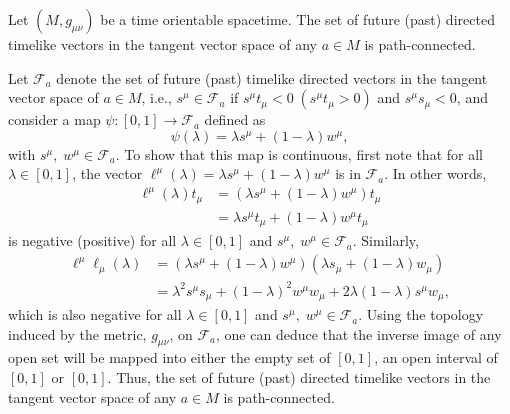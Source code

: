 \documentclass[
12pt,		%
openright,	%
twoside,  %
a4paper,			%
chapter=TITLE,		%
english,			%
french,				%
spanish,			%
brazil				%
]{USPSC-classe/USPSC}
\newenvironment{sproof}{%
  \renewcommand{\proofname}{Sketch of Proof}\proof}{\endproof}
\begin{document}
\begin{proposition}\label{lightcone}
    Let $(M,g_{\mu\nu})$ be a time orientable spacetime. The set of future (past) directed timelike vectors in the tangent vector space of any $a\in M$ is path-connected.
\end{proposition}
\begin{sproof}
    Let $\mathcal{F}_a$ denote the set of future (past) timelike directed vectors in the tangent vector space of $a\in M$, i.e., $s^{\mu}\in\mathcal{F}_a$ if $s^{\mu}t_{\mu}<0\;(s^{\mu}t_{\mu}>0)$ and $s^{\mu}s_{\mu}<0$, and consider a map $\psi:[0,1]\to\mathcal{F}_a$ defined as
    \begin{equation}
        \psi(\lambda)=\lambda s^{\mu}+(1-\lambda)w^{\mu},
    \end{equation}
    with $s^{\mu},\;w^{\mu}\in\mathcal{F}_a$. To show that this map is continuous, first note that for all $\lambda\in[0,1]$, the vector $\ell^{\mu}(\lambda)=\lambda s^{\mu}+(1-\lambda)w^{\mu}$ is in $\mathcal{F}_a$. In other words,
    \begin{equation}
        \begin{aligned}
           \ell^{\mu}(\lambda)t_{\mu}&=(\lambda s^{\mu}+(1-\lambda)w^{\mu})t_{\mu}\\
           &=\lambda s^{\mu}t_{\mu}+(1-\lambda)w^{\mu}t_{\mu}
        \end{aligned}
    \end{equation}
is negative (positive) for all $\lambda\in[0,1]$ and $s^{\mu},\;w^{\mu}\in\mathcal{F}_a$. Similarly,
\begin{equation}
        \begin{aligned}
           \ell^{\mu}\ell_{\mu}(\lambda)&=(\lambda s^{\mu}+(1-\lambda)w^{\mu})(\lambda s_{\mu}+(1-\lambda)w_{\mu})\\
           &=\lambda^2s^{\mu}s_{\mu}+(1-\lambda)^2w^{\mu}w_{\mu}+2\lambda(1-\lambda)s^{\mu}w_{\mu},
        \end{aligned}
    \end{equation}
    which is also negative for all $\lambda\in[0,1]$ and $s^{\mu},\;w^{\mu}\in\mathcal{F}_a$. Using the topology induced by the metric, $g_{\mu\nu}$, on $\mathcal{F}_a$, one can deduce that the inverse image of any open set will be mapped into either the empty set of $[0,1]$, an open interval of $[0,1]$ or $[0,1]$. Thus, the set of future (past) directed timelike vectors in the tangent vector space of any $a\in M$ is path-connected.
\end{sproof}
\end{document}
